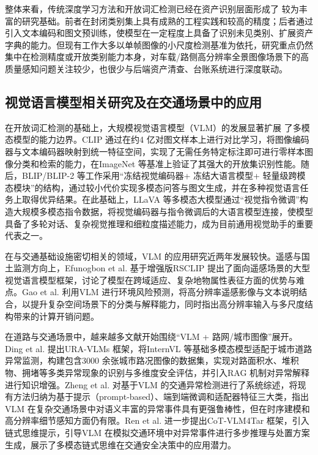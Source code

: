 整体来看，传统深度学习方法和开放词汇检测已经在资产识别层面形成了
较为丰富的研究基础。前者在封闭类别集上具有成熟的工程实践和较高的精度；后者通过引入文本编码和图文预训练，使模型在一定程度上具备了识别未见类别、扩展资产字典的能力。但现有工作大多以单帧图像的小尺度检测基准为依托，研究重点仍然集中在检测精度或开放类别能力本身，对车载/路侧高分辨率全景图像场景下的高质量感知问题关注较少，也很少与后端资产清查、台账系统进行深度联动。

\subsection{视觉语言模型相关研究及在交通场景中的应用}
在开放词汇检测的基础上，大规模视觉语言模型（VLM）的发展显著扩展
了多模态模型的能力边界。CLIP 通过在约4 亿对图文样本上进行对比学习，将图像编码器与文本编码器映射到统一特征空间，实现了无需任务特定标注即可进行零样本图像分类和检索的能力，在ImageNet 等基准上验证了其强大的开放集识别性能\cite{deng2009imagenet,radford2021learning}。随后，BLIP/BLIP-2 等工作采用“冻结视觉编码器+ 冻结大语言模型+ 轻量级跨模态模块”的结构，通过较小代价实现多模态问答与图文生成，并在多种视觉语言任务上取得优异结果\cite{li2022blip,li2023blip,ding2025urban}。在此基础上，LLaVA 等多模态大模型通过“视觉指令微调”构造大规模多模态指令数据，将视觉编码器与指令微调后的大语言模型连接，使模型具备了多轮对话、复杂视觉推理和细粒度描述能力，成为目前通用视觉助手的重要代表之一\cite{li2024llava,wang2024qwen2}。

在与交通基础设施密切相关的领域，VLM 的应用研究近两年发展较快。遥感与国土监测方向上，Efunogbon et al. 基于增强版RSCLIP 提出了面向遥感场景的大型视觉语言模型框架，讨论了模型在跨域适应、复杂地物属性表征方面的优势与难点\cite{efunogbon2025large}。Gao et al. 利用VLM 进行环境风险预测，将高分辨率遥感影像与文本说明结合，以提升复杂空间场景下的分类与解释能力，同时指出高分辨率输入与多尺度结构带来的计算开销问题\cite{gao2025vision}。

在道路与交通场景中，越来越多文献开始围绕“VLM + 路网/城市图像”展开。Ding et al. 提出URA-VLMs 框架，将InternVL 等基础多模态模型适配于城市道路异常监测，构建包含3000 余张城市路况图像的数据集，实现对路面积水、堆积物、拥堵等多类异常现象的识别与多维度安全评估，并引入RAG 机制对异常解释进行知识增强\cite{ding2025urban}。Zheng et al. 对基于VLM 的交通异常检测进行了系统综述，将现有方法归纳为基于提示（prompt-based）、端到端微调和适配器特征三大类，指出VLM 在复杂交通场景中对语义丰富的异常事件具有更强鲁棒性，但在时序建模和高分辨率细节感知方面仍有限\cite{zhengvideo}。Ren et al. 进一步提出CoT-VLM4Tar 框架，引入链式思维提示，引导VLM 在模拟交通环境中对异常事件进行多步推理与处置方案生成，展示了多模态链式思维在交通安全决策中的应用潜力\cite{ren2025cot}。

